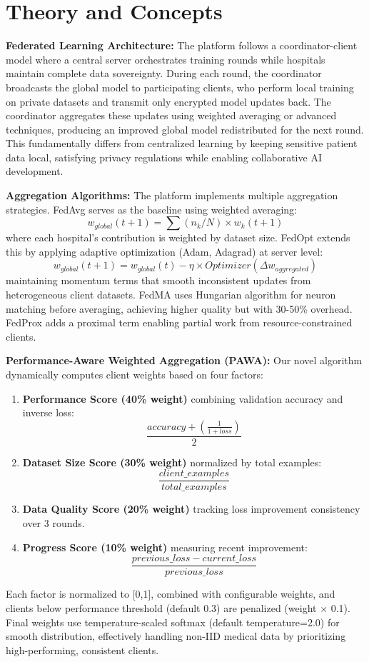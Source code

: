 \section{Theory and Concepts}

\textbf{Federated Learning Architecture:} The platform follows a coordinator-client model where a central server orchestrates training rounds while hospitals maintain complete data sovereignty. During each round, the coordinator broadcasts the global model to participating clients, who perform local training on private datasets and transmit only encrypted model updates back. The coordinator aggregates these updates using weighted averaging or advanced techniques, producing an improved global model redistributed for the next round. This fundamentally differs from centralized learning by keeping sensitive patient data local, satisfying privacy regulations while enabling collaborative AI development.

\textbf{Aggregation Algorithms:} The platform implements multiple aggregation strategies. FedAvg serves as the baseline using weighted averaging:
\[ w_{global}(t+1) = \sum(n_k / N) \times w_k(t+1) \]
where each hospital's contribution is weighted by dataset size. FedOpt extends this by applying adaptive optimization (Adam, Adagrad) at server level:
\[ w_{global}(t+1) = w_{global}(t) - \eta \times Optimizer(\Delta w_{aggregated}) \]
maintaining momentum terms that smooth inconsistent updates from heterogeneous client datasets. FedMA uses Hungarian algorithm for neuron matching before averaging, achieving higher quality but with 30-50\% overhead. FedProx adds a proximal term enabling partial work from resource-constrained clients.

\textbf{Performance-Aware Weighted Aggregation (PAWA):} Our novel algorithm dynamically computes client weights based on four factors:
\begin{enumerate}
    \item \textbf{Performance Score (40\% weight)} combining validation accuracy and inverse loss:
    \[ \frac{accuracy + \left( \frac{1}{1 + loss} \right)}{2} \]
    \item \textbf{Dataset Size Score (30\% weight)} normalized by total examples:
    \[ \frac{client\_examples}{total\_examples} \]
    \item \textbf{Data Quality Score (20\% weight)} tracking loss improvement consistency over 3 rounds.
    \item \textbf{Progress Score (10\% weight)} measuring recent improvement:
    \[ \frac{previous\_loss - current\_loss}{previous\_loss} \]
\end{enumerate}
Each factor is normalized to [0,1], combined with configurable weights, and clients below performance threshold (default 0.3) are penalized (weight $\times$ 0.1). Final weights use temperature-scaled softmax (default temperature=2.0) for smooth distribution, effectively handling non-IID medical data by prioritizing high-performing, consistent clients.

